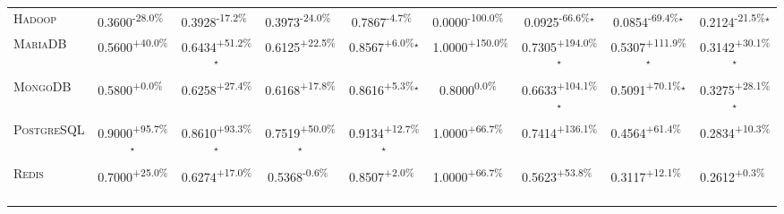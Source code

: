 \begin{table}[htbp]
\begin{tabular}{l|cccc|cccc}
\textsc{Hadoop} & \cellcolor{red!30}0.3600\textsuperscript{-28.0\%}$^{\,\,\,}$ & \cellcolor{red!30}0.3928\textsuperscript{-17.2\%}$^{\,\,\,}$ & \cellcolor{red!30}0.3973\textsuperscript{-24.0\%}$^{\,\,\,}$ & \cellcolor{red!30}0.7867\textsuperscript{-4.7\%}$^{\,\,\,}$ & \cellcolor{red!30}0.0000\textsuperscript{-100.0\%}$^{\,\,\,}$ & \cellcolor{red!30}0.0925\textsuperscript{-66.6\%}$^\star$ & \cellcolor{red!30}0.0854\textsuperscript{-69.4\%}$^\star$ & \cellcolor{red!30}0.2124\textsuperscript{-21.5\%}$^\star$ \\
\textsc{MariaDB} & \cellcolor{green!30}0.5600\textsuperscript{+40.0\%}$^{\,\,\,}$ & \cellcolor{green!30}0.6434\textsuperscript{+51.2\%}$^\star$ & \cellcolor{green!30}0.6125\textsuperscript{+22.5\%}$^{\,\,\,}$ & \cellcolor{green!30}0.8567\textsuperscript{+6.0\%}$^\star$ & \cellcolor{green!30}1.0000\textsuperscript{+150.0\%}$^{\,\,\,}$ & \cellcolor{green!30}0.7305\textsuperscript{+194.0\%}$^\star$ & \cellcolor{green!30}0.5307\textsuperscript{+111.9\%}$^\star$ & \cellcolor{green!30}0.3142\textsuperscript{+30.1\%}$^\star$ \\
\textsc{MongoDB} & \cellcolor{green!30}0.5800\textsuperscript{+0.0\%}$^{\,\,\,}$ & \cellcolor{green!30}0.6258\textsuperscript{+27.4\%}$^{\,\,\,}$ & \cellcolor{green!30}0.6168\textsuperscript{+17.8\%}$^{\,\,\,}$ & \cellcolor{green!30}0.8616\textsuperscript{+5.3\%}$^\star$ & \cellcolor{red!30}0.8000\textsuperscript{0.0\%}$^{\,\,\,}$ & \cellcolor{green!30}0.6633\textsuperscript{+104.1\%}$^\star$ & \cellcolor{green!30}0.5091\textsuperscript{+70.1\%}$^\star$ & \cellcolor{green!30}0.3275\textsuperscript{+28.1\%}$^\star$ \\
\textsc{PostgreSQL} & \cellcolor{green!30}0.9000\textsuperscript{+95.7\%}$^\star$ & \cellcolor{green!30}0.8610\textsuperscript{+93.3\%}$^\star$ & \cellcolor{green!30}0.7519\textsuperscript{+50.0\%}$^\star$ & \cellcolor{green!30}0.9134\textsuperscript{+12.7\%}$^\star$ & \cellcolor{green!30}1.0000\textsuperscript{+66.7\%}$^{\,\,\,}$ & \cellcolor{green!30}0.7414\textsuperscript{+136.1\%}$^{\,\,\,}$ & \cellcolor{green!30}0.4564\textsuperscript{+61.4\%}$^{\,\,\,}$ & \cellcolor{green!30}0.2834\textsuperscript{+10.3\%}$^{\,\,\,}$ \\
\textsc{Redis} & \cellcolor{green!30}0.7000\textsuperscript{+25.0\%}$^{\,\,\,}$ & \cellcolor{green!30}0.6274\textsuperscript{+17.0\%}$^{\,\,\,}$ & \cellcolor{red!30}0.5368\textsuperscript{-0.6\%}$^{\,\,\,}$ & \cellcolor{green!30}0.8507\textsuperscript{+2.0\%}$^{\,\,\,}$ & \cellcolor{green!30}1.0000\textsuperscript{+66.7\%}$^{\,\,\,}$ & \cellcolor{green!30}0.5623\textsuperscript{+53.8\%}$^{\,\,\,}$ & \cellcolor{green!30}0.3117\textsuperscript{+12.1\%}$^{\,\,\,}$ & \cellcolor{green!30}0.2612\textsuperscript{+0.3\%}$^{\,\,\,}$ \\

\end{tabular}
\end{table}
